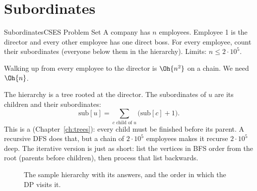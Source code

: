 \section[Subordinates]{Subordinates \hfill \gold}\label{wp:subordinates}

\begin{statement}{Subordinates}{CSES Problem Set}
A company has $n$ employees. Employee 1 is the director and every other employee has one direct boss. For every employee,
count their subordinates (everyone below them in the hierarchy). Limits: $n \le 2\cdot 10^5$.
\end{statement}

 Walking up from every employee to the director is $\Oh{n^2}$ on a chain. We need $\Oh{n}$.

 The hierarchy is a tree rooted at the director. The subordinates of $u$ are its children and their
subordinates:
\[
  \mathrm{sub}[u] = \sum_{c \text{ child of } u} \bigl(\mathrm{sub}[c] + 1\bigr).
\]
This is a  (Chapter~\ref{ch:trees}): every child must be finished before its parent. A recursive DFS does
that, but a chain of $2\cdot10^5$ employees makes it recurse $2\cdot10^5$ deep. The iterative version is just as short: list
the vertices in BFS order from the root (parents before children), then process that list backwards.

\begin{figure}[H]
\centering
{}
\caption{The sample hierarchy with its answers, and the order in which the DP visits it.}
\end{figure}

